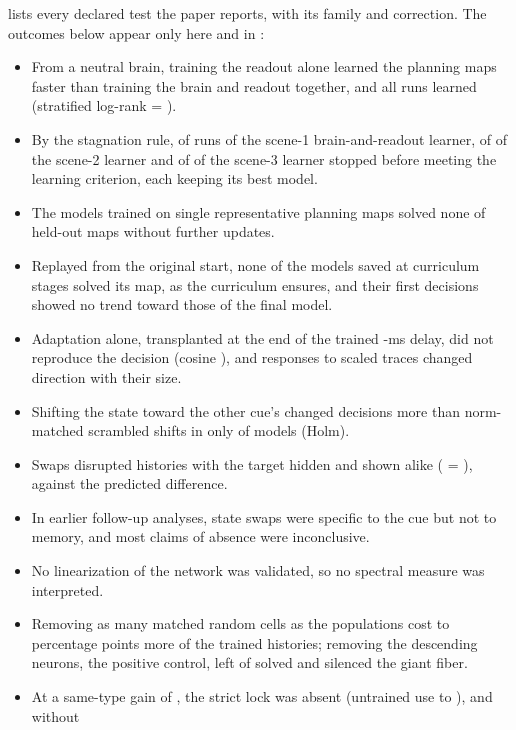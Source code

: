  lists every declared test the paper reports, with its family and correction. The outcomes below appear only here and
in :
\begin{itemize}
\item From a neutral brain, training the readout alone learned the planning maps faster than training the brain and readout
together, and all  runs learned (stratified log-rank \Pv{} = ).
\item By the stagnation rule,  of  runs of the scene-1 brain-and-readout learner,  of 
of the scene-2 learner and  of  of the scene-3 learner stopped before meeting the learning criterion,
each keeping its best model.
\item The models trained on single representative planning maps solved none of  held-out maps without further
updates.
\item Replayed from the original start, none of the  models saved at curriculum stages solved its map, as the
curriculum ensures, and their first decisions showed no trend toward those of the final model.
\item Adaptation alone, transplanted at the end of the trained -ms delay, did not reproduce the decision (cosine
), and responses to scaled traces changed direction with their size.
\item Shifting the state toward the other cue's changed decisions more than norm-matched scrambled shifts in only
 of  models (Holm).
\item Swaps disrupted histories with the target hidden and shown alike (\Pv{} = ), against the predicted difference.
\item In earlier follow-up analyses, state swaps were specific to the cue but not to memory, and most claims of absence were
inconclusive.
\item No linearization of the network was validated, so no spectral measure was interpreted.
\item Removing as many matched random cells as the populations cost  to  percentage points more of the
trained histories; removing the descending neurons, the positive control, left  of  solved and
silenced the giant fiber.
\item At a same-type gain of , the strict lock was absent (untrained use  to ), and without

\end{itemize}
